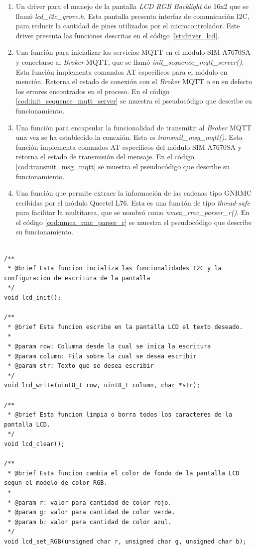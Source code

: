 \begin{enumerate}
	\item Un driver para el manejo de la pantalla \textit{LCD RGB Backlight} de 16x2 que se llamó \textit{lcd\_i2c\_grove.h}. Esta pantalla presenta interfaz de comunicación I2C, para reducir la cantidad de pines utilizados por el microcontrolador. Este driver presenta las funciones descritas en el código \ref{lst:driver_lcd}.
	
	\item Una función para inicializar los servicios MQTT en el módulo SIM A7670SA y conectarse al \textit{Broker} MQTT, que se llamó \textit{init\_sequence\_mqtt\_server()}. Esta función implementa comandos AT específicos para el módulo en mención. Retorna el estado de conexión con el \textit{Broker} MQTT o en su defecto los errores encontrados en el proceso. En el código \ref{cod:init_sequence_mqtt_server} se muestra el pseudocódigo que describe su funcionamiento.
	
	\item Una función para encapsular la funcionalidad de transmitir al \textit{Broker} MQTT una vez se ha establecido la conexión. Esta es \textit{transmit\_msg\_mqtt()}. Esta función implementa comandos AT específicos del módulo SIM A7670SA y retorna el estado de transmisión del mensaje. En el código \ref{cod:transmit_msg_mqtt} se muestra el pseudocódigo que describe su funcionamiento.
	
	\item Una función que permite extraer la información de las cadenas tipo GNRMC recibidas por el módulo Quectel L76. Esta es una función de tipo \textit{thread-safe} para facilitar la multitarea, que se nombró como \textit{nmea\_rmc\_parser\_r()}. En el código \ref{cod:nmea_rmc_parser_r} se muestra el pseudocódigo que describe su funcionamiento.
\end{enumerate}


\begin{lstlisting}[label={lst:driver_lcd}, caption={Funciones principales del driver LCD.}] 

/**
 * @brief Esta funcion incializa las funcionalidades I2C y la configuracion de escritura de la pantalla
 */
void lcd_init();

/**
 * @brief Esta funcion escribe en la pantalla LCD el texto deseado.
 * 
 * @param row: Columna desde la cual se inica la escritura
 * @param column: Fila sobre la cual se desea escribir
 * @param str: Texto que se desea escribir
 */
void lcd_write(uint8_t row, uint8_t column, char *str);

/**
 * @brief Esta funcion limpia o borra todos los caracteres de la pantalla LCD.
 */
void lcd_clear();

/**
 * @brief Esta funcion cambia el color de fondo de la pantalla LCD segun el modelo de color RGB.
 * 
 * @param r: valor para cantidad de color rojo.
 * @param g: valor para cantidad de color verde.
 * @param b: valor para cantidad de color azul.
 */
void lcd_set_RGB(unsigned char r, unsigned char g, unsigned char b);

\end{lstlisting}


